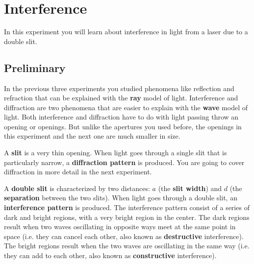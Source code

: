 \setcounter{chapter}{8}
\chapter{Interference}
%
In this experiment you will learn about interference in light from a laser due to a double slit.
%
\section{Preliminary}
%
In the previous three experiments you studied phenomena like reflection and refraction that can be explained with the \textbf{ray} model of light. Interference and diffraction are two phenomena that are easier to explain with the \textbf{wave} model of light. Both interference and diffraction have to do with light passing throw an opening or openings. But unlike the apertures you used before, the openings in this experiment and the next one are much smaller in size.

A \textbf{slit} is a very thin opening. When light goes through a single slit that is particularly narrow, a \textbf{diffraction pattern} is produced. You are going to cover diffraction in more detail in the next experiment.

A \textbf{double slit} is characterized by two distances: $a$ (the \textbf{slit width}) and $d$ (the \textbf{separation} between the two slits). When light goes through a double slit, an \textbf{interference pattern} is produced. The interference pattern consist of a series of dark and bright regions, with a very bright region in the center. The dark regions result when two waves oscillating in opposite ways meet at the same point in space (i.e. they can cancel each other, also known as \textbf{destructive} interference). The bright regions result when the two waves are oscillating in the same way (i.e. they can add to each other, also known as \textbf{constructive} interference).

